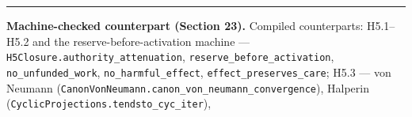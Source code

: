\documentclass[
]{article}
\begin{document}
\begin{center}\rule{0.5\linewidth}{0.5pt}\end{center}

\textbf{Machine-checked counterpart (Section 23).} Compiled
counterparts: H5.1--H5.2 and the reserve-before-activation machine ---
\texttt{H\allowbreak{}5\allowbreak{}C\allowbreak{}l\allowbreak{}o\allowbreak{}s\allowbreak{}u\allowbreak{}r\allowbreak{}e\allowbreak{}.\allowbreak{}a\allowbreak{}u\allowbreak{}t\allowbreak{}h\allowbreak{}o\allowbreak{}r\allowbreak{}i\allowbreak{}t\allowbreak{}y\allowbreak{}\_\allowbreak{}a\allowbreak{}t\allowbreak{}t\allowbreak{}e\allowbreak{}n\allowbreak{}u\allowbreak{}a\allowbreak{}t\allowbreak{}i\allowbreak{}o\allowbreak{}n},
\texttt{r\allowbreak{}e\allowbreak{}s\allowbreak{}e\allowbreak{}r\allowbreak{}v\allowbreak{}e\allowbreak{}\_\allowbreak{}b\allowbreak{}e\allowbreak{}f\allowbreak{}o\allowbreak{}r\allowbreak{}e\allowbreak{}\_\allowbreak{}a\allowbreak{}c\allowbreak{}t\allowbreak{}i\allowbreak{}v\allowbreak{}a\allowbreak{}t\allowbreak{}i\allowbreak{}o\allowbreak{}n},
\texttt{no\_unfunded\_work},
\texttt{n\allowbreak{}o\allowbreak{}\_\allowbreak{}h\allowbreak{}a\allowbreak{}r\allowbreak{}m\allowbreak{}f\allowbreak{}u\allowbreak{}l\allowbreak{}\_\allowbreak{}e\allowbreak{}f\allowbreak{}f\allowbreak{}e\allowbreak{}c\allowbreak{}t},
\texttt{e\allowbreak{}f\allowbreak{}f\allowbreak{}e\allowbreak{}c\allowbreak{}t\allowbreak{}\_\allowbreak{}p\allowbreak{}r\allowbreak{}e\allowbreak{}s\allowbreak{}e\allowbreak{}r\allowbreak{}v\allowbreak{}e\allowbreak{}s\allowbreak{}\_\allowbreak{}c\allowbreak{}a\allowbreak{}r\allowbreak{}e};
H5.3 --- von Neumann
(\texttt{C\allowbreak{}a\allowbreak{}n\allowbreak{}o\allowbreak{}n\allowbreak{}V\allowbreak{}o\allowbreak{}n\allowbreak{}N\allowbreak{}e\allowbreak{}u\allowbreak{}m\allowbreak{}a\allowbreak{}n\allowbreak{}n\allowbreak{}.\allowbreak{}c\allowbreak{}a\allowbreak{}n\allowbreak{}o\allowbreak{}n\allowbreak{}\_\allowbreak{}v\allowbreak{}o\allowbreak{}n\allowbreak{}\_\allowbreak{}n\allowbreak{}e\allowbreak{}u\allowbreak{}m\allowbreak{}a\allowbreak{}n\allowbreak{}n\allowbreak{}\_\allowbreak{}c\allowbreak{}o\allowbreak{}n\allowbreak{}v\allowbreak{}e\allowbreak{}r\allowbreak{}g\allowbreak{}e\allowbreak{}n\allowbreak{}c\allowbreak{}e}),
Halperin
(\texttt{C\allowbreak{}y\allowbreak{}c\allowbreak{}l\allowbreak{}i\allowbreak{}c\allowbreak{}P\allowbreak{}r\allowbreak{}o\allowbreak{}j\allowbreak{}e\allowbreak{}c\allowbreak{}t\allowbreak{}i\allowbreak{}o\allowbreak{}n\allowbreak{}s\allowbreak{}.\allowbreak{}t\allowbreak{}e\allowbreak{}n\allowbreak{}d\allowbreak{}s\allowbreak{}t\allowbreak{}o\allowbreak{}\_\allowbreak{}c\allowbreak{}y\allowbreak{}c\allowbreak{}\_\allowbreak{}i\allowbreak{}t\allowbreak{}e\allowbreak{}r}),
\end{document}
